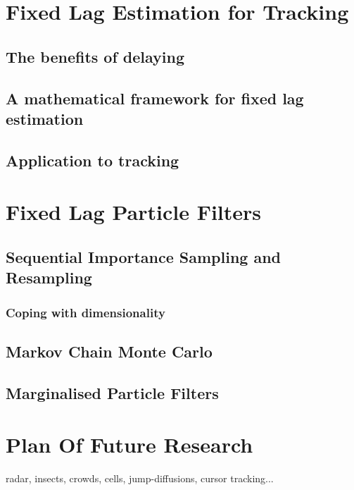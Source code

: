 \documentclass{RJWThesis}
\begin{document}
\chapter{Fixed Lag Estimation for Tracking}
\section{The benefits of delaying}

\section{A mathematical framework for fixed lag estimation}

\section{Application to tracking}


\chapter{Fixed Lag Particle Filters}
\section{Sequential Importance Sampling and Resampling}
\subsection{Coping with dimensionality}
\section{Markov Chain Monte Carlo}
\section{Marginalised Particle Filters}

\chapter{Plan Of Future Research}
radar, insects, crowds, cells, jump-diffusions, cursor tracking...



\end{document}
